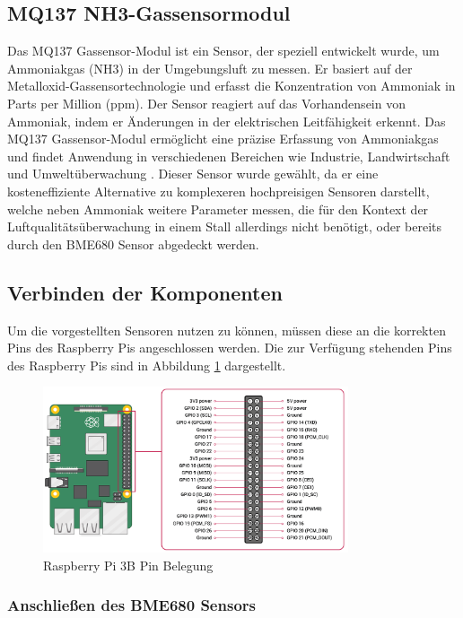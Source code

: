 \documentclass[conference]{IEEEtran}
\begin{document}
\subsection{MQ137 NH3-Gassensormodul}
Das MQ137 Gassensor-Modul ist ein Sensor, der speziell entwickelt wurde, um Ammoniakgas (NH3) in der Umgebungsluft zu messen. Er basiert auf der Metalloxid-Gassensortechnologie und erfasst die Konzentration von Ammoniak in Parts per Million (ppm). Der Sensor reagiert auf das Vorhandensein von Ammoniak, indem er Änderungen in der elektrischen Leitfähigkeit erkennt. Das MQ137 Gassensor-Modul ermöglicht eine präzise Erfassung von Ammoniakgas und findet Anwendung in verschiedenen Bereichen wie Industrie, Landwirtschaft und Umweltüberwachung \cite{mqDataSheet}. Dieser Sensor wurde gewählt, da er eine kosteneffiziente Alternative zu komplexeren hochpreisigen Sensoren darstellt, welche neben Ammoniak weitere Parameter messen, die für den Kontext der Luftqualitätsüberwachung in einem Stall allerdings nicht benötigt, oder bereits durch den BME680 Sensor abgedeckt werden.

\subsection{Verbinden der Komponenten}
Um die vorgestellten Sensoren nutzen zu können, müssen diese an die korrekten Pins des Raspberry Pis angeschlossen werden. Die zur Verfügung stehenden Pins des Raspberry Pis sind in Abbildung \ref{pi_pins} dargestellt.

\begin{figure}[H]
	\centering
	\includegraphics[width=90mm]{fig/pi_pins.png}
	\caption{Raspberry Pi 3B Pin Belegung \cite{bmeAbbildungen}}
	\label{pi_pins}
\end{figure}

\subsubsection{Anschließen des BME680 Sensors} 
\end{document}
